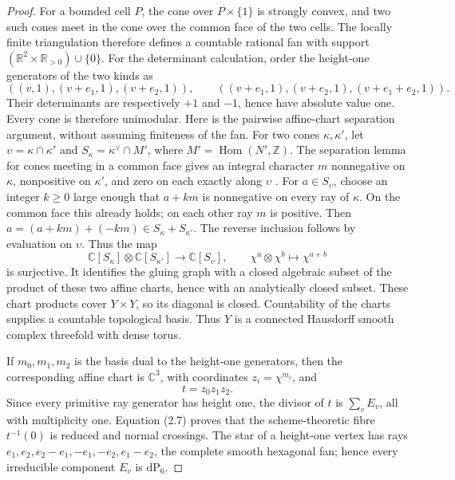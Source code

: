\begin{proof}
For a bounded cell \(P\), the cone over \(P\times\{1\}\) is strongly
convex, and two such cones meet in the cone over the common face of the two
cells.  The locally finite triangulation therefore defines a countable
rational fan with support
\((\mathbb R^2\times\mathbb R_{>0})\cup\{0\}\).  For the determinant
calculation, order the height-one generators of the two kinds as
\[
 ((v,1),(v+e_1,1),(v+e_2,1)),\qquad
 ((v+e_1,1),(v+e_2,1),(v+e_1+e_2,1)).
\]
Their determinants are respectively \(+1\) and \(-1\), hence have absolute
value one.  Every cone is therefore unimodular.  Here is the pairwise
affine-chart separation argument, without assuming finiteness of the fan.
For two cones \(\kappa,\kappa'\), let \(\upsilon=\kappa\cap\kappa'\)
and \(S_\kappa=\kappa^\vee\cap M'\), where \(M'=\operatorname{Hom}(N',\mathbb Z)\).
The separation lemma for cones meeting in a common face gives an integral
character \(m\) nonnegative on \(\kappa\), nonpositive on \(\kappa'\),
and zero on each exactly along \(\upsilon\)
\cite[Proposition~3.1.3 and its separation lemma, pp.~106--108]{CoxLittleSchenck2011}.
For \(a\in S_\upsilon\), choose an integer \(k\ge0\) large enough
that \(a+km\) is nonnegative on every ray of \(\kappa\).  On the
common face this already holds; on each other ray \(m\) is positive.
Then \(a=(a+km)+(-km)\in S_\kappa+S_{\kappa'}\).  The reverse
inclusion follows by evaluation on \(\upsilon\).  Thus the map
\[
 \mathbb C[S_\kappa]\otimes\mathbb C[S_{\kappa'}]
 \longrightarrow\mathbb C[S_\upsilon],\qquad
 \chi^a\otimes\chi^b\longmapsto\chi^{a+b}
\]
is surjective.  It identifies the gluing graph with a closed algebraic
subset of the product of these two affine charts, hence with an
analytically closed subset.  These chart products cover \(Y\times Y\),
so its diagonal is closed.  Countability of the charts supplies a
countable topological basis.  Thus \(Y\) is a
connected Hausdorff smooth complex threefold with dense torus.

If \(m_0,m_1,m_2\) is the basis dual to the height-one generators, then the
corresponding affine chart is \(\mathbb C^3\), with coordinates
\(z_i=\chi^{m_i}\), and
\[
 t=z_0z_1z_2.
\tag{2.7}
\]
Since every primitive ray generator has height one, the divisor of \(t\) is
\(\sum_vE_v\), all with multiplicity one.  Equation (2.7) proves that the
scheme-theoretic fibre \(t^{-1}(0)\) is reduced and normal crossings.
The star of a height-one vertex has rays
\(e_1,e_2,e_2-e_1,-e_1,-e_2,e_1-e_2\), the complete smooth hexagonal fan;
hence every irreducible component \(E_v\) is \(\mathrm{dP}_6\).


\end{proof}
